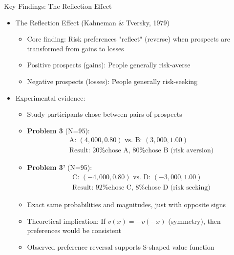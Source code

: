 \documentclass[10pt]{beamer}
\begin{document}
\begin{frame}{Key Findings: The Reflection Effect}
  \begin{itemize}[<+->]
    \item The Reflection Effect (Kahneman \& Tversky, 1979)
      \begin{itemize}
        \item Core finding: Risk preferences "reflect" (reverse) when prospects are transformed from gains to losses
        \item Positive prospects (gains): People generally risk-averse
        \item Negative prospects (losses): People generally risk-seeking
      \end{itemize}
    \item Experimental evidence:
      \begin{itemize}
        \item Study participants chose between pairs of prospects
        \item \textbf{Problem 3} (N=95):
          \begin{align*}
            &\text{A: } (4,000, 0.80) \text{ vs. B: } (3,000, 1.00)\\
            &\text{Result: 20\% chose A, 80\% chose B (risk aversion)}
          \end{align*}
        \item \textbf{Problem 3'} (N=95):
          \begin{align*}
            &\text{C: } (-4,000, 0.80) \text{ vs. D: } (-3,000, 1.00)\\
            &\text{Result: 92\% chose C, 8\% chose D (risk seeking)}
          \end{align*}
        \item Exact same probabilities and magnitudes, just with opposite signs
        \item Theoretical implication: If $v(x) = -v(-x)$ (symmetry), then preferences would be consistent
        \item Observed preference reversal supports S-shaped value function
      \end{itemize}
  \end{itemize}
\end{frame}
\end{document}
